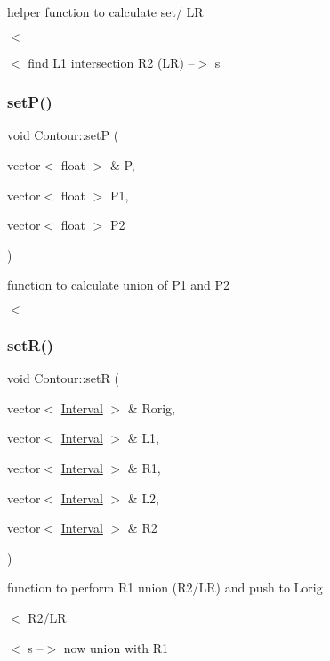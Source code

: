 helper function to calculate set/ LR 

$<$

$<$ find L1 intersection R2 (LR) --$>$ s \mbox{\label{classContour_a74ab977c279575010af78733569c648d}} 
\subsubsection{\texorpdfstring{set\+P()}{setP()}}
{\footnotesize\ttfamily void Contour\+::setP (\begin{DoxyParamCaption}\item[{vector$<$ float $>$ \&}]{P,  }\item[{vector$<$ float $>$}]{P1,  }\item[{vector$<$ float $>$}]{P2 }\end{DoxyParamCaption})}



function to calculate union of P1 and P2 

$<$ \mbox{\label{classContour_aeff6ed3f1354733449c660ec77008093}} 
\subsubsection{\texorpdfstring{set\+R()}{setR()}}
{\footnotesize\ttfamily void Contour\+::setR (\begin{DoxyParamCaption}\item[{vector$<$ \hyperlink{classInterval}{Interval} $>$ \&}]{Rorig,  }\item[{vector$<$ \hyperlink{classInterval}{Interval} $>$ \&}]{L1,  }\item[{vector$<$ \hyperlink{classInterval}{Interval} $>$ \&}]{R1,  }\item[{vector$<$ \hyperlink{classInterval}{Interval} $>$ \&}]{L2,  }\item[{vector$<$ \hyperlink{classInterval}{Interval} $>$ \&}]{R2 }\end{DoxyParamCaption})}



function to perform R1 union (R2/\+LR) and push to Lorig 

$<$ R2/\+LR

$<$ s --$>$ now union with R1 \mbox{\label{classContour_aa22cbdbd91f5422225eb9508d4a7983a}} 
